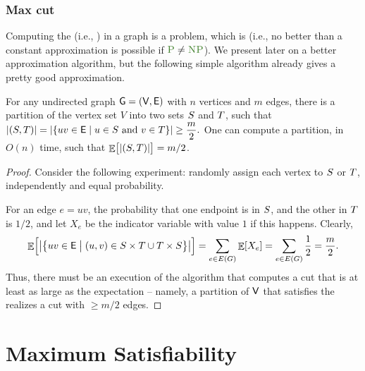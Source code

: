 \subsubsection{Max cut}

Computing the  (i.e., ) in a graph
is a \NPComplete problem, which is \APXHard (i.e., no better than a
constant approximation is possible if $\POLYT \neq \NP$). We present
later on a better approximation algorithm, but the following simple
algorithm already gives a pretty good approximation.

\begin{theorem}
    For any undirected graph $\mathsf{G} =(\mathsf{V},\mathsf{E})$ with $n$
    vertices and $m$ edges, there is a partition of the vertex set $V$
    into two sets $S$ and $T$, such that
    \begin{math}
        \ds%
        \cardin{(\SetA,\SetB)}%
        =%
        \cardin{\Set{ u v \in \Edges}{ u \in \SetA \text{ and } v \in
              \SetB }} \geq%
        \frac{m}{2}.
    \end{math}
    One can compute a partition, in $O(n)$ time, such that
    $\mathop{\mathbb{E}}\!\left[ {\bigl.\left| {(S,T)} \right|} \right] =m/2$.
\end{theorem}

\begin{proof}
    Consider the following experiment: randomly assign each
    vertex to $S$ or $T$, independently and equal
    probability.

    For an edge $e=u v$, the probability that one endpoint is in
    $S$, and the other in $T$ is $1/2$, and let $X_e$ be the
    indicator variable with value $1$ if this happens. Clearly,
    \begin{equation*}
        \Ex{ \cardin{\Set{ u v \in \Edges }{ (u,v) \in %
                 \SetA \times \SetB \cup \SetB \times \SetA
                 \bigr. }}\Bigr.}
        =%
        \sum_{e \in E(G)} \Ex{ X_e } =%
        \sum_{e \in E(G)} \frac{1}{2} = \frac{m}{2}.
    \end{equation*}
    Thus, there must be an execution of the algorithm that computes a
    cut that is at least as large as the expectation -- namely, a
    partition of $\mathsf{V}$ that satisfies the realizes a cut with
    $\geq m/2$ edges.
\end{proof}

\section{Maximum Satisfiability}

